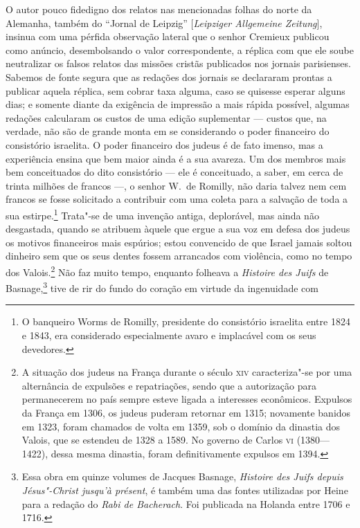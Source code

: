  O autor pouco fidedigno dos relatos nas mencionadas folhas do norte da
Alemanha, também do “Jornal de Leipzig” [\textit{Leipziger Allgemeine
Zeitung}], insinua com uma pérfida observação lateral que o senhor
Cremieux publicou como anúncio, desembolsando o valor correspondente, a
réplica com que ele soube neutralizar os falsos relatos das missões
cristãs publicados nos jornais parisienses. Sabemos de fonte segura que
as redações dos jornais se declararam prontas a publicar aquela
réplica, sem cobrar taxa alguma, caso se quisesse esperar alguns dias;
e somente diante da exigência de impressão a mais rápida possível,
algumas redações calcularam os custos de uma edição suplementar ---
custos que, na verdade, não são de grande monta em se considerando o
poder financeiro do consistório israelita. O poder financeiro dos
judeus é de fato imenso, mas a experiência ensina que bem maior ainda é
a sua avareza. Um dos membros mais bem conceituados do dito consistório
--- ele é conceituado, a saber, em cerca de trinta milhões de francos ---,
o senhor W.~de Romilly, não daria talvez nem cem francos se fosse
solicitado a contribuir com uma coleta para a salvação de toda a sua
estirpe.\footnote{ O banqueiro Worms de Romilly, presidente do
consistório israelita entre 1824 e 1843, era considerado especialmente
avaro e implacável com os seus devedores.} Trata"-se de uma
invenção antiga, deplorável, mas ainda não desgastada, quando se
atribuem àquele que ergue a sua voz em defesa dos judeus os motivos
financeiros mais espúrios; estou convencido de que Israel jamais soltou
dinheiro sem que os seus dentes fossem arrancados com violência, como
no tempo dos Valois.\footnote{ A situação dos judeus na França durante
o século \textsc{xiv} caracteriza"-se por uma alternância de expulsões e
repatriações, sendo que a autorização para permanecerem no país sempre
esteve ligada a interesses econômicos. Expulsos da França em 1306, os
judeus puderam retornar em 1315; novamente banidos em 1323, foram
chamados de volta em 1359, sob o domínio da dinastia dos Valois, que se
estendeu de 1328 a 1589. No governo de Carlos \textsc{vi} (1380---1422), dessa
mesma dinastia, foram definitivamente expulsos em 1394.} Não faz
muito tempo, enquanto folheava a \textit{Histoire des Juifs} de
Basnage,\footnote{ Essa obra em quinze volumes de Jacques Basnage,
\textit{Histoire des Juifs depuis Jésus"-Christ jusqu’à présent}, é
também uma das fontes utilizadas por Heine para a redação do
\textit{Rabi de Bacherach}. Foi publicada na Holanda entre 1706 e 1716.} 
tive de rir do fundo do coração em virtude da ingenuidade com
